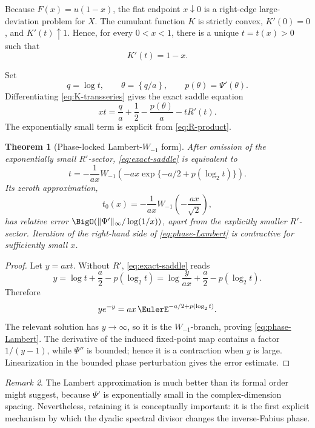 \documentclass[11pt,oneside]{article}
\newtheorem{theorem}{Theorem}[section]
\theoremstyle{definition}
\theoremstyle{remark}
\newtheorem{remark}[theorem]{Remark}
\begin{document}
Because \(F(x)=u(1-x)\), the flat endpoint \(x\downarrow0\) is a right-edge
large-deviation problem for \(X\).  The cumulant function \(K\) is strictly
convex, \(K'(0)=0\), and \(K'(t)\uparrow1\).  Hence, for every
\(0<x<1\), there is a unique \(t=t(x)>0\) such that
\begin{equation}
 K'(t)=1-x.
 \label{eq:saddle-eq}
\end{equation}

Set
\[
 q=\log t,\qquad
 \theta=\left\{q/a\right\},\qquad
 p(\theta)=\Psi'(\theta).
\]
Differentiating \eqref{eq:K-transseries} gives the exact saddle equation
\begin{equation}
 xt
 =\frac q a+\frac12-\frac{p(\theta)}a-tR'(t).
 \label{eq:exact-saddle}
\end{equation}
The exponentially small term is explicit from \eqref{eq:R-product}.

\begin{theorem}[Phase-locked Lambert-\(W_{-1}\) form]
\label{thm:Lambert}
After omission of the exponentially small \(R'\)-sector,
\eqref{eq:exact-saddle} is equivalent to
\begin{equation}
 \boxed{\displaystyle
 t=
 -\frac1{ax}
 W_{-1}\!\left(
  -ax\exp\{-a/2+p(\log_2t)\}
 \right).}
 \label{eq:phase-Lambert}
\end{equation}
Its zeroth approximation,
\begin{equation}
 t_0(x)=
 -\frac1{ax}W_{-1}\!\left(-\frac{ax}{\sqrt2}\right),
 \label{eq:Lambert0}
\end{equation}
has relative error
\(\BigO(\|\Psi'\|_\infty/\log(1/x))\), apart from the explicitly
smaller \(R'\)-sector.  Iteration of the right-hand side of
\eqref{eq:phase-Lambert} is contractive for sufficiently small \(x\).
\end{theorem}

\begin{proof}
Let \(y=axt\).  Without \(R'\), \eqref{eq:exact-saddle} reads
\[
 y=\log t+\frac a2-p(\log_2t)
   =\log\frac{y}{ax}+\frac a2-p(\log_2t).
\]
Therefore
\[
 ye^{-y}=ax\,\EulerE^{-a/2+p(\log_2t)}.
\]
The relevant solution has \(y\to\infty\), so it is the
\(W_{-1}\)-branch, proving \eqref{eq:phase-Lambert}.  The derivative of
the induced fixed-point map contains a factor \(1/(y-1)\), while
\(\Psi''\) is bounded; hence it is a contraction when \(y\) is large.
Linearization in the bounded phase perturbation gives the error estimate.
\end{proof}

\begin{remark}
The Lambert approximation is much better than its formal order might suggest,
because \(\Psi'\) is exponentially small in the complex-dimension spacing.
Nevertheless, retaining it is conceptually important: it is the first
explicit mechanism by which the dyadic spectral divisor changes the
inverse-Fabius phase.
\end{remark}
\end{document}
